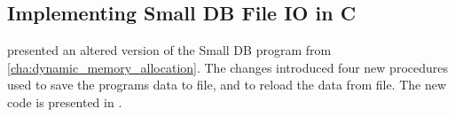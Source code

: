\subsection{Implementing Small DB File IO in C} %
\label{sub:implementing_small_db_file_io_in_c}

 presented an altered version of the Small DB program from \cref{cha:dynamic_memory_allocation}. The changes introduced four new procedures used to save the programs data to file, and to reload the data from file. The new code is presented in .



